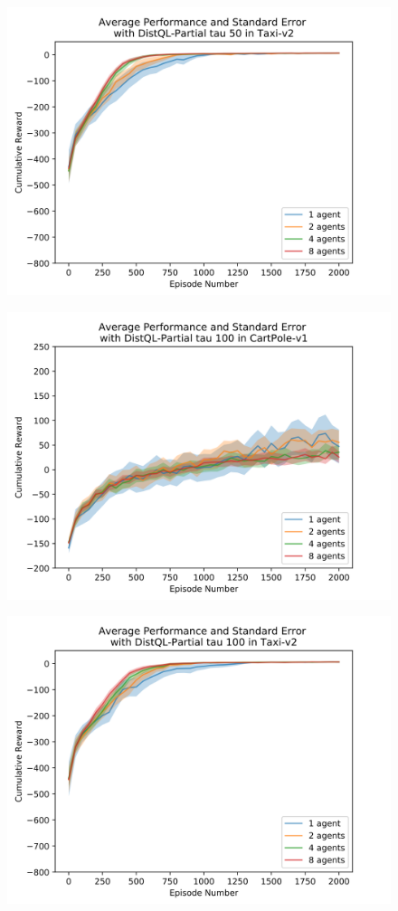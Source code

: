 \documentclass[jair,twoside,11pt,theapa]{article}
\begin{document}
\begin{figure}[h]
	\centering
	\includegraphics[width=0.7\linewidth]{resultImages/binned-Average-Performance-and-Standard-Error-with-DistQL-Partial-tau-50-in-Taxi-v2}
	\caption{}
	\label{fig:binned-Average-Performance-and-Standard-Error-with-DistQL-Partial-tau-50-in-Taxi-v2}
\end{figure}

\begin{figure}[h]
	\centering
	\includegraphics[width=0.7\linewidth]{resultImages/binned-Average-Performance-and-Standard-Error-with-DistQL-Partial-tau-100-in-CartPole-v1}
	\caption{}
	\label{fig:binned-Average-Performance-and-Standard-Error-with-DistQL-Partial-tau-100-in-CartPole-v1}
\end{figure}

\begin{figure}[h]
	\centering
	\includegraphics[width=0.7\linewidth]{resultImages/binned-Average-Performance-and-Standard-Error-with-DistQL-Partial-tau-100-in-Taxi-v2}
	\caption{}
	\label{fig:binned-Average-Performance-and-Standard-Error-with-DistQL-Partial-tau-100-in-Taxi-v2}
\end{figure}
\fi
\end{document}
